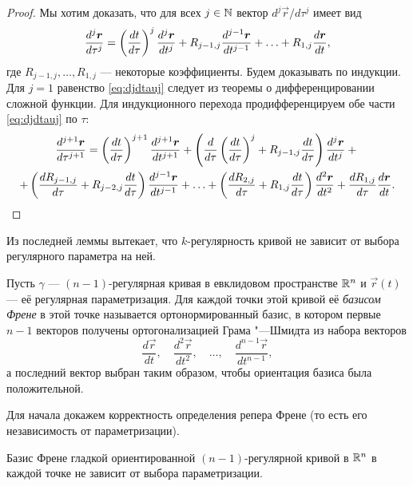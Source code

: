 \begin{proof}
	Мы хотим доказать, что для всех $j \in \mathbb{N}$ вектор $d^j\vec{r} / d\tau^j$ имеет вид
	\begin{equation} \label{eq:djdtauj}
		\frac{d^j\boldsymbol{r}}{d\tau^j} = \left(\frac{dt}{d\tau}\right)^j\frac{d^j\boldsymbol{r}}{dt^j} + R_{j - 1, j}\frac{d^{j - 1}\boldsymbol{r}}{dt^{j - 1}} + \ldots + R_{1, j}\frac{d\boldsymbol{r}}{dt},
	\end{equation}
	где $R_{j - 1, j}, \ldots, R_{1, j}$ --- некоторые коэффициенты. Будем доказывать по индукции. Для $j = 1$ равенство \eqref{eq:djdtauj} следует из теоремы о дифференцировании сложной функции. Для индукционного перехода продифференцируем обе части \eqref{eq:djdtauj} по $\tau$:
	\begin{multline*}
		\frac{d^{j + 1}\boldsymbol{r}}{d\tau^{j + 1}} = \left(\frac{dt}{d\tau}\right)^{j + 1}\frac{d^{j + 1}\boldsymbol{r}}{{dt^{j + 1}}} + \left(\frac{d}{d\tau}\left(\frac{dt}{d\tau}\right)^j + R_{j - 1, j}\frac{dt}{d\tau}\right)\frac{d^j\boldsymbol{r}}{dt^j} + {}\\ + \left(\frac{dR_{j - 1, j}}{d\tau} + R_{j - 2, j}\frac{dt}{d\tau}\right)\frac{d^{j - 1}\boldsymbol{r}}{dt^{j - 1}} + \ldots + \left(\frac{dR_{2, j}}{d\tau} + R_{1, j}\frac{dt}{d\tau}\right)\frac{d^2\boldsymbol{r}}{dt^2} + \frac{dR_{1, j}}{d\tau}\frac{d\boldsymbol{r}}{dt}.
	\end{multline*}
\end{proof}

Из последней леммы вытекает, что $k$-регулярность кривой не зависит от выбора регулярного параметра на ней.

\begin{definition}
	Пусть $\gamma$ --- $(n - 1)$-регулярная кривая в евклидовом пространстве $\mathbb{R}^n$ и $\vec{r}(t)$ --- её регулярная параметризация. Для каждой точки этой кривой её \textit{базисом Френе} в этой точке называется ортонормированный базис, в котором первые $n - 1$ векторов получены ортогонализацией Грама "---Шмидта из набора векторов
	\[
		\frac{d\vec{r}}{dt},\quad\frac{d^2\vec{r}}{dt^2},\quad\ldots,\quad \frac{d^{n - 1}\vec{r}}{dt^{n - 1}},
	\]
	а последний вектор выбран таким образом, чтобы ориентация базиса была положительной.
\end{definition}

Для начала докажем корректность определения репера Френе (то есть его независимость от параметризации).

\begin{proposition}
	Базис Френе гладкой ориентированной $(n - 1)$-регулярной кривой в $\mathbb{R}^n$ в каждой точке не зависит от выбора параметризации.
\end{proposition}

